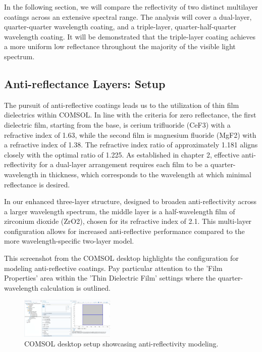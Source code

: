 In the following section, we will compare the reflectivity of two distinct multilayer coatings across an extensive spectral range. The analysis will cover a dual-layer, quarter-quarter wavelength coating, and a triple-layer, quarter-half-quarter wavelength coating. It will be demonstrated that the triple-layer coating achieves a more uniform low reflectance throughout the majority of the visible light spectrum.



\subsection{Anti-reflectance Layers: Setup}

The pursuit of anti-reflective coatings leads us to the utilization of thin film dielectrics within COMSOL. In line with the criteria for zero reflectance, the first dielectric film, starting from the base, is cerium trifluoride (CeF3) with a refractive index of 1.63, while the second film is magnesium fluoride (MgF2) with a refractive index of 1.38. The refractive index ratio of approximately 1.181 aligns closely with the optimal ratio of 1.225. As established in chapter 2, effective anti-reflectivity for a dual-layer arrangement requires each film to be a quarter-wavelength in thickness, which corresponds to the wavelength at which minimal reflectance is desired.

In our enhanced three-layer structure, designed to broaden anti-reflectivity across a larger wavelength spectrum, the middle layer is a half-wavelength film of zirconium dioxide (ZrO2), chosen for its refractive index of 2.1. This multi-layer configuration allows for increased anti-reflective performance compared to the more wavelength-specific two-layer model.

This screenshot from the COMSOL desktop highlights the configuration for modeling anti-reflective coatings. Pay particular attention to the 'Film Properties' area within the 'Thin Dielectric Film' settings where the quarter-wavelength calculation is outlined.

\begin{figure}[ht!]
  \centering
  \includegraphics[width=0.4\textwidth]{Chapters/Figures/Chapter 4 Figures/COMSOL Desktop Showcasing Antireflectivity Setup.png}
  \caption{COMSOL desktop setup showcasing anti-reflectivity modeling.}
  \label{fig:COMSOL desktop showcasing antireflectivity}
\end{figure}

